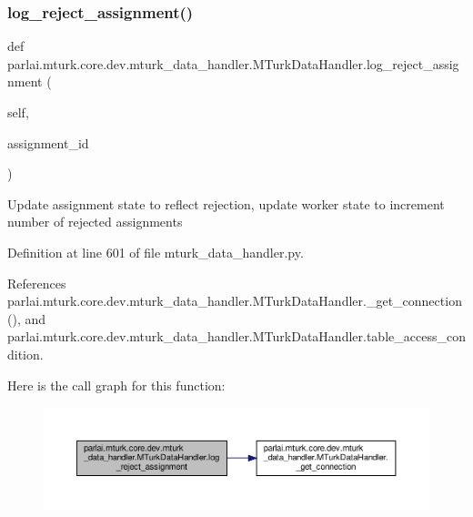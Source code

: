 \subsubsection{\texorpdfstring{log\+\_\+reject\+\_\+assignment()}{log\_reject\_assignment()}}
{\footnotesize\ttfamily def parlai.\+mturk.\+core.\+dev.\+mturk\+\_\+data\+\_\+handler.\+M\+Turk\+Data\+Handler.\+log\+\_\+reject\+\_\+assignment (\begin{DoxyParamCaption}\item[{}]{self,  }\item[{}]{assignment\+\_\+id }\end{DoxyParamCaption})}

\begin{DoxyVerb}Update assignment state to reflect rejection, update worker state to
increment number of rejected assignments
\end{DoxyVerb}
 

Definition at line 601 of file mturk\+\_\+data\+\_\+handler.\+py.



References parlai.\+mturk.\+core.\+dev.\+mturk\+\_\+data\+\_\+handler.\+M\+Turk\+Data\+Handler.\+\_\+get\+\_\+connection(), and parlai.\+mturk.\+core.\+dev.\+mturk\+\_\+data\+\_\+handler.\+M\+Turk\+Data\+Handler.\+table\+\_\+access\+\_\+condition.

Here is the call graph for this function\+:
\nopagebreak
\begin{figure}[H]
\begin{center}
\leavevmode
\includegraphics[width=350pt]{classparlai_1_1mturk_1_1core_1_1dev_1_1mturk__data__handler_1_1MTurkDataHandler_afd8d5abb26cbd00f96ff7d8ad44b1f49_cgraph}
\end{center}
\end{figure}
\mbox{\label{classparlai_1_1mturk_1_1core_1_1dev_1_1mturk__data__handler_1_1MTurkDataHandler_aa084ae52cbcc1fdce7e5a20f079f3f47}} 
